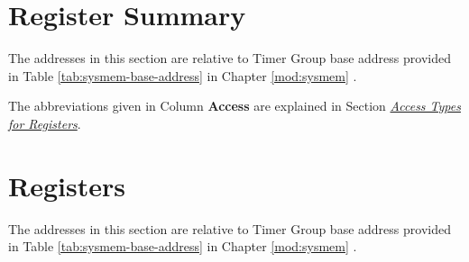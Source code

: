 \documentclass[main\_\_EN.tex]{subfiles}
\begin{document}



\clearpage
\hypertarget{timg-reg-summ}{}
\section{Register Summary}
\label{sec:timg-reg-summ}

The addresses in this section are relative to Timer Group base address provided in Table \ref{tab:sysmem-base-address} in Chapter \ref{mod:sysmem} \textit{}.

The abbreviations given in Column \textbf{Access} are explained in Section \hyperref[glossary-access-types]{\textit{Access Types for Registers}}.






\clearpage
\section{Registers}

The addresses in this section are relative to Timer Group base address provided in Table \ref{tab:sysmem-base-address} in Chapter \ref{mod:sysmem} \textit{}.


\end{document}
